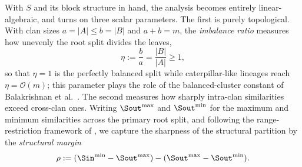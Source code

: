 With $S$ and its block structure in hand, the analysis becomes entirely
linear-algebraic, and turns on three scalar parameters. The first is purely
topological. With clan sizes $a=|A|\le b=|B|$ and $a+b=m$, the \emph{imbalance
ratio} measures how unevenly the root split divides the leaves,
\begin{equation}\label{eq:imbalance_ratio}
   \eta:=\frac{b}{a}=\frac{|B|}{|A|}\ge1,
\end{equation}
so that $\eta=1$ is the perfectly balanced split while caterpillar-like lineages
reach $\eta=\mathcal O(m)$; this parameter plays the role of the
balanced-cluster constant of Balakrishnan et al.\
\cite{Balakrishnan2011clustering}. The second measures how sharply intra-clan
similarities exceed cross-clan ones. Writing $\Sout^{\max}$ and $\Sout^{\min}$
for the maximum and minimum similarities across the primary root split, and
following the range-restriction framework of \cite{Balakrishnan2011clustering},
we capture the sharpness of the structural partition by the \emph{structural
margin}
\begin{equation}\label{eq:margin_definition}
   \rho := (\Sin^{\min}-\Sout^{\max})-(\Sout^{\max}-\Sout^{\min}).
\end{equation}
